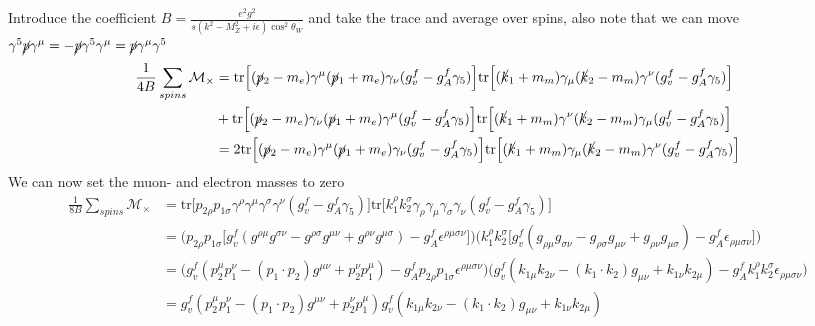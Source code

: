 \documentclass[11pt]{article}
\begin{document}
\begin{flushleft}
Introduce the coefficient  $B = \frac{e^2 g^2}{s(k^2 - M_Z^2 + i \epsilon)\cos^2 \theta_W}$ and take the trace and average over spins, also note that we can move $\gamma^5 \cancel{p}\gamma^{\mu}= -\cancel{p} \gamma^5 \gamma^{\mu} = \cancel{p}\gamma^{\mu} \gamma^5$
\begin{align*}
\frac{1}{4B} \sum_{spins} \mathcal{M}_{\times} &= \text{tr} \Big[
 (\cancel{p}_2 - m_e) \gamma^{\mu} (\cancel{p}_1 + m_e) \gamma_{\nu} (g_v^f - g_A^f \gamma_5) \Big] \text{tr} \Big[(\cancel{k}_1 + m_m) \gamma_{\mu} (\cancel{k}_2 - m_m) \gamma^{\nu} (g_v^f - g_A^f \gamma_5) \Big] \\
&+ \text{tr} \Big[
(\cancel{p}_2 - m_e) \gamma_{\nu}(\cancel{p}_1 + m_e) \gamma^{\mu} (g_v^f - g_A^f \gamma_5)  \Big]
\text{tr}
\Big[
(\cancel{k}_1 +m_m) \gamma^{\nu}  (\cancel{k}_2 -m_m) \gamma_{\mu} (g_v^f - g_A^f \gamma_5) \Big] \\
&= 2 \text{tr} \Big[
 (\cancel{p}_2 - m_e) \gamma^{\mu} (\cancel{p}_1 + m_e) \gamma_{\nu} (g_v^f - g_A^f \gamma_5) \Big] \text{tr} \Big[(\cancel{k}_1 + m_m) \gamma_{\mu} (\cancel{k}_2 - m_m) \gamma^{\nu} (g_v^f - g_A^f \gamma_5) \Big]
\end{align*}
We can now set the muon- and electron masses to zero
\begin{align*}
\frac{1}{8B} \sum_{spins} \mathcal{M}_{\times} &=  \text{tr} \Big[ p_{2 \rho} p_{1 \sigma}\gamma^{\rho}
\gamma^{\mu} \gamma^{\sigma} \gamma^{\nu} (g_v^f - g_A^f \gamma_5) \Big] \text{tr} \Big[ k_1^{\rho} k_2^{\sigma} \gamma_{\rho} \gamma_{\mu} \gamma_{\sigma} \gamma_{\nu} (g_v^f - g_A^f \gamma_5) \Big] \\
&= \Big( p_{2 \rho} p_{1 \sigma} \big[ g_v^f(g^{\rho \mu} g^{\sigma \nu} - g^{\rho \sigma}g^{\mu \nu} + g^{\rho \nu}g^{\mu \sigma}) - g_A^f \epsilon^{\rho \mu \sigma \nu} \big] \Big)
\Big( k_1^{\rho} k_2^{\sigma}  \big[ g_v^f (g_{\rho \mu} g_{\sigma \nu} - g_{\rho \sigma}g_{\mu \nu} + g_{\rho \nu}g_{\mu \sigma})- g_A^f \epsilon_{\rho \mu \sigma \nu}\big] \Big) \\
&= \Big( g_v^f(p_2^{\mu} p_1^{\nu} - (p_1 \cdot p_2)g^{\mu \nu} + p_2^{\nu} p_1^{\mu}) - g_A^f p_{2 \rho} p_{1 \sigma}\epsilon^{\rho \mu \sigma \nu}  \Big)
\Big(  g_v^f (k_{1 \mu} k_{2 \nu} - (k_1 \cdot k_2)g_{\mu \nu} + k_{1 \nu} k_{2 \mu})- g_A^f k_1^{\rho} k_2^{\sigma} \epsilon_{\rho \mu \sigma \nu} \Big) \\
&= 
g_v^f(p_2^{\mu} p_1^{\nu} - (p_1 \cdot p_2)g^{\mu \nu} + p_2^{\nu} p_1^{\mu})
 g_v^f (k_{1 \mu} k_{2 \nu} - (k_1 \cdot k_2)g_{\mu \nu} + k_{1 \nu} k_{2 \mu}) \\

\end{align*}
\end{flushleft}
\end{document}
